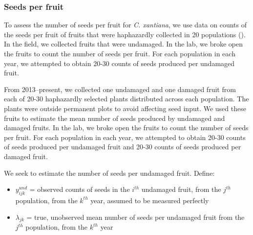 \documentclass[12pt, oneside, titlepage]{article}   	%
\begin{document}
\subsubsection*{Seeds per fruit}

To assess the number of seeds per fruit for \textit{C. xantiana}, we use data on counts of the seeds per fruit of fruits that were haphazardly collected in 20 populations (\cite{eckhart2011}). In the field, we collected fruits that were undamaged. In the lab, we broke open the fruits to count the number of seeds per fruit. For each population in each year, we attempted to obtain 20-30 counts of seeds produced per undamaged fruit. 


From 2013--present, we collected one undamaged and one damaged fruit from each of 20-30 haphazardly selected plants distributed across each population. The plants were outside permanent plots to avoid affecting seed input. We used these fruits to estimate the mean number of seeds produced by undamaged and damaged fruits. In the lab, we broke open the fruits to count the number of seeds per fruit. For each population in each year, we attempted to obtain 20-30 counts of seeds produced per undamaged fruit and  20-30 counts of seeds produced per damaged fruit. 

We seek to estimate the number of seeds per undamaged fruit. Define:


\begin{itemize}
	\item $y^{und}_{ijk}$ = observed counts of seeds in the $i^{th}$ undamaged fruit, from the $j^{th}$ population, from the $k^{th}$ year, assumed to be measured perfectly
	\item $\lambda_{jk}$ = true, unobserved mean number of seeds per undamaged fruit from the $j^{th}$ population, from the $k^{th}$ year
\end{itemize}
\end{document}
